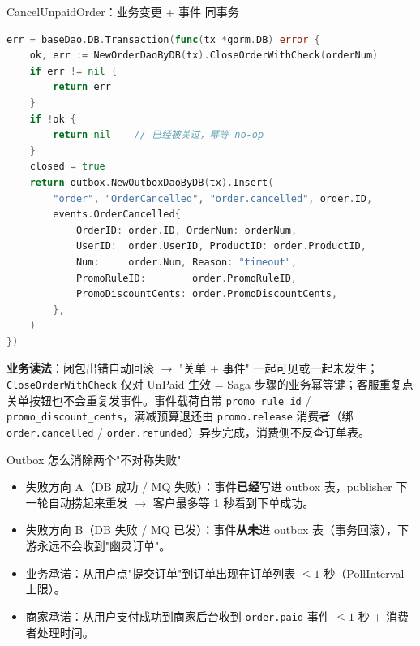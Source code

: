\documentclass[aspectratio=169,11pt]{beamer}
\begin{document}
\begin{frame}{CancelUnpaidOrder：业务变更 + 事件 同事务}
\begin{lstlisting}[language=Go,firstnumber=31,
  caption={}]
err = baseDao.DB.Transaction(func(tx *gorm.DB) error {
    ok, err := NewOrderDaoByDB(tx).CloseOrderWithCheck(orderNum)
    if err != nil {
        return err
    }
    if !ok {
        return nil    // 已经被关过，幂等 no-op
    }
    closed = true
    return outbox.NewOutboxDaoByDB(tx).Insert(
        "order", "OrderCancelled", "order.cancelled", order.ID,
        events.OrderCancelled{
            OrderID: order.ID, OrderNum: orderNum,
            UserID:  order.UserID, ProductID: order.ProductID,
            Num:     order.Num, Reason: "timeout",
            PromoRuleID:        order.PromoRuleID,
            PromoDiscountCents: order.PromoDiscountCents,
        },
    )
})
\end{lstlisting}
\vspace{1mm}
\small \textbf{业务读法}：闭包出错自动回滚 $\to$ "关单 + 事件" 一起可见或一起未发生；\texttt{CloseOrderWithCheck} 仅对 UnPaid 生效 = Saga 步骤的业务幂等键；客服重复点关单按钮也不会重复发事件。事件载荷自带 \texttt{promo\_rule\_id} / \texttt{promo\_discount\_cents}，满减预算退还由 \texttt{promo.release} 消费者（绑 \texttt{order.cancelled} / \texttt{order.refunded}）异步完成，消费侧不反查订单表。
\end{frame}

\begin{frame}[shrink]{Outbox 怎么消除两个"不对称失败"}
\begin{itemize}
  \item 失败方向 A（DB 成功 / MQ 失败）：事件\textbf{已经}写进 outbox 表，publisher 下一轮自动捞起来重发 $\to$ 客户最多等 1 秒看到下单成功。
  \item 失败方向 B（DB 失败 / MQ 已发）：事件\textbf{从未}进 outbox 表（事务回滚），下游永远不会收到"幽灵订单"。
  \item 业务承诺：从用户点"提交订单"到订单出现在订单列表 $\leq 1$ 秒（PollInterval 上限）。
  \item 商家承诺：从用户支付成功到商家后台收到 \texttt{order.paid} 事件 $\leq 1$ 秒 + 消费者处理时间。
\end{itemize}
\vspace{1mm}
\end{frame}
\end{document}
